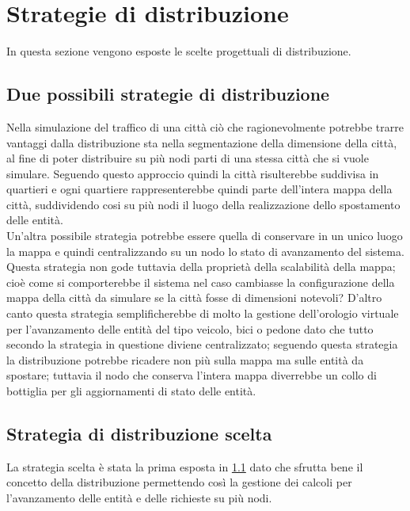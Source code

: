 \section{Strategie di distribuzione}
In questa sezione vengono esposte le scelte progettuali di distribuzione.\\
\subsection{Due possibili strategie di distribuzione}
\label{scelted}
Nella simulazione del traffico di una città ciò che ragionevolmente potrebbe trarre vantaggi dalla distribuzione sta nella segmentazione della dimensione della città, al fine di poter distribuire su più nodi parti di una stessa città che si vuole simulare. Seguendo questo approccio quindi la città risulterebbe suddivisa in quartieri e ogni quartiere rappresenterebbe quindi parte dell'intera mappa della città, suddividendo cosi su più nodi il luogo della realizzazione dello spostamento delle entità. \\
Un'altra possibile strategia potrebbe essere quella di conservare in un unico luogo la mappa e quindi centralizzando su un nodo lo stato di avanzamento del sistema. Questa strategia non gode tuttavia della proprietà della scalabilità della mappa; cioè come si comporterebbe il sistema nel caso cambiasse la configurazione della mappa della città da simulare se la città fosse di dimensioni notevoli? D'altro canto questa strategia semplificherebbe di molto la gestione dell'orologio virtuale per l'avanzamento delle entità del tipo veicolo, bici o pedone dato che tutto secondo la strategia in questione diviene centralizzato; seguendo questa strategia la distribuzione potrebbe ricadere non più sulla mappa ma sulle entità da spostare; tuttavia il nodo che conserva l'intera mappa diverrebbe un collo di bottiglia per gli aggiornamenti di stato delle entità. \\
\subsection{Strategia di distribuzione scelta}
La strategia scelta è stata la prima esposta in \ref{scelted} dato che sfrutta bene il concetto della distribuzione permettendo così la gestione dei calcoli per l'avanzamento delle entità e delle richieste su più nodi.

